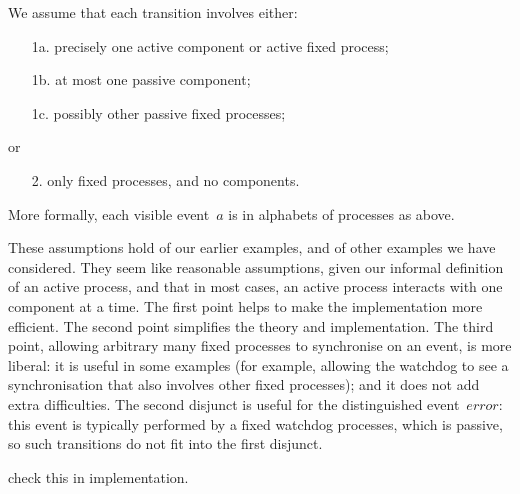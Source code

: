 \begin{assumption}
We assume that each transition involves either:
%
\begin{enumerate}
\item[1a.] precisely one active component or active fixed process;
\item[1b.] at most one passive component;
\item[1c.] possibly other passive fixed processes;
\end{enumerate}
%
or
\begin{enumerate}
\item[2.] only fixed processes, and no components.
\end{enumerate}
%
More formally, each visible event~$a$ is in alphabets of processes as above. 
\end{assumption}
%
These assumptions hold of our earlier examples, and of other examples we have
considered.  They seem like reasonable assumptions, given our informal
definition of an active process, and that in most cases, an active process
interacts with one component at a time.  The first point helps to make the
implementation more efficient.  The second point simplifies the theory and
implementation.  The third point, allowing arbitrary many fixed processes to
synchronise on an event, is more liberal: it is useful in some examples (for
example, allowing the watchdog to see a synchronisation that also involves
other fixed processes); and it does not add extra difficulties.  The second
disjunct is useful for the distinguished event~$error$: this event is
typically performed by a fixed watchdog processes, which is passive, so such
transitions do not fit into the first disjunct.


\begin{improve}
check this in implementation.
\end{improve}

